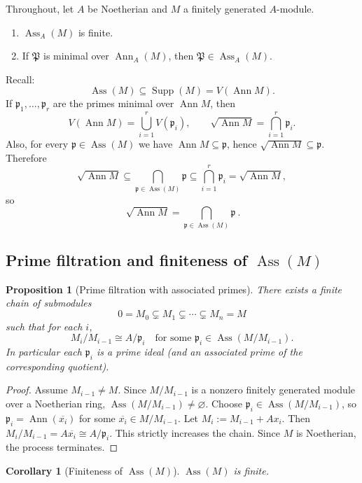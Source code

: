 \documentclass[11pt,a4paper]{article}
\theoremstyle{definition}
\theoremstyle{plain}
\newtheorem{proposition}[definition]{Proposition}
\newtheorem{corollary}[definition]{Corollary}
\theoremstyle{remark}
\newcommand{\Ann}{\operatorname{Ann}}
\newcommand{\Supp}{\operatorname{Supp}}
\newcommand{\Ass}{\operatorname{Ass}}
\begin{document}
Throughout, let $A$ be Noetherian and $M$ a finitely generated $A$-module.

\begin{enumerate}
    \item $\Ass_A(M)$ is finite.
    \item If $\mathfrak{P}$ is minimal over $\Ann_A(M)$, then $\mathfrak{P}\in \Ass_A(M)$.
\end{enumerate}

Recall:
\[
\Ass(M)\subseteq \Supp(M)=V(\Ann M).
\]
If $\mathfrak{p}_1,\dots,\mathfrak{p}_r$ are the primes minimal over $\Ann M$, then
\[
V(\Ann M)=\bigcup_{i=1}^r V(\mathfrak{p}_i),
\qquad
\sqrt{\Ann M}=\bigcap_{i=1}^r \mathfrak{p}_i.
\]
Also, for every $\mathfrak{p}\in \Ass(M)$ we have $\Ann M\subseteq \mathfrak{p}$, hence
$\sqrt{\Ann M}\subseteq \mathfrak{p}$. Therefore
\[
\sqrt{\Ann M}\subseteq \bigcap_{\mathfrak{p}\in \Ass(M)}\mathfrak{p}
\subseteq \bigcap_{i=1}^r \mathfrak{p}_i=\sqrt{\Ann M},
\]
so
\[
\boxed{\ \sqrt{\Ann M}=\bigcap_{\mathfrak{p}\in \Ass(M)}\mathfrak{p}\ }.
\]


\subsection*{Prime filtration and finiteness of $\Ass(M)$}

\begin{proposition}[Prime filtration with associated primes]
There exists a finite chain of submodules
\[
0=M_0\subsetneq M_1\subsetneq \cdots \subsetneq M_n=M
\]
such that for each $i$,
\[
M_i/M_{i-1}\cong A/\mathfrak{p}_i
\quad\text{for some }\mathfrak{p}_i\in \Ass(M/M_{i-1}).
\]
In particular each $\mathfrak{p}_i$ is a prime ideal (and an associated prime of the corresponding quotient).
\end{proposition}

\begin{proof}
Assume $M_{i-1}\neq M$. Since $M/M_{i-1}$ is a nonzero finitely generated module over a Noetherian ring,
$\Ass(M/M_{i-1})\neq \varnothing$. Choose $\mathfrak{p}_i\in \Ass(M/M_{i-1})$, so
$\mathfrak{p}_i=\Ann(\overline{x_i})$ for some $\overline{x_i}\in M/M_{i-1}$.
Let $M_i:=M_{i-1}+Ax_i$. Then $M_i/M_{i-1}=A\overline{x_i}\cong A/\mathfrak{p}_i$.
This strictly increases the chain. Since $M$ is Noetherian, the process terminates.
\end{proof}

\begin{corollary}[Finiteness of $\Ass(M)$]
$\Ass(M)$ is finite.
\end{corollary}
\end{document}
